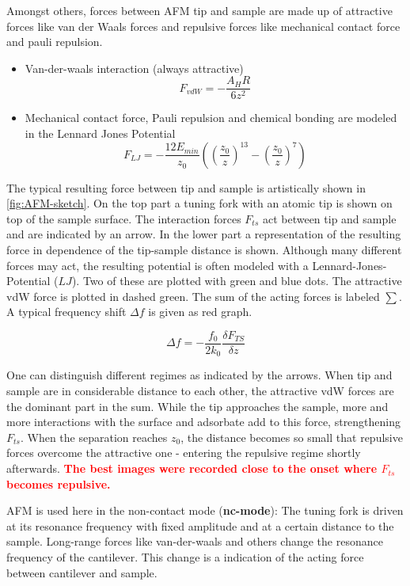 Amongst others, forces between AFM tip and sample are made up of attractive forces like van der Waals forces and repulsive forces like mechanical contact force and pauli repulsion.

\begin{itemize}
 \item Van-der-waals interaction (always attractive)
 $$ F_{vdW} = - \frac{A_HR}{6z^2}$$
 \item Mechanical contact force, Pauli repulsion and chemical bonding are modeled in the Lennard Jones Potential
$$ F_{LJ} = - \frac{12 E_{min}}{z_0} \left ( \left (\frac{z_0}{z} \right ) ^{13} - \left ( \frac{z_0}{z} \right )^7 \right ) $$
\end{itemize}

The typical resulting force between tip and sample is artistically shown in \autoref{fig:AFM-sketch}. On the top part a tuning fork with an atomic tip is shown on top of the sample surface. The interaction forces $F_{ts}$ act between tip and sample and are indicated by an arrow. In the lower part a representation of the resulting force in dependence of the tip-sample distance is shown. Although many different forces may act, the resulting potential is often modeled with a Lennard-Jones-Potential ($LJ$)\cite{jones_determination_1924}. Two of these are plotted with green and blue dots. The attractive vdW force is plotted in dashed green. The sum of the acting forces is labeled $\sum$. A typical frequency shift $\Delta f$ is given as red graph. 

$$\Delta f = - \frac{f_0}{2k_0}\frac{\delta F_{TS}}{\delta z}$$

One can distinguish different regimes as indicated by the arrows. When tip and sample are in considerable distance to each other, the attractive vdW forces are the dominant part in the sum. While the tip approaches the sample, more and more interactions with the surface and adsorbate add to this force, strengthening $F_{ts}$. When the separation reaches $z_0$, the distance becomes so small that repulsive forces overcome the attractive one - entering the repulsive regime shortly afterwards. \textcolor{red}{\textbf{The best images were recorded close to the onset where $F_{ts}$ becomes repulsive.}}

AFM is used here in the non-contact mode (\textbf{nc-mode}): The tuning fork is driven at its resonance frequency with fixed amplitude and at a certain distance to the sample. Long-range forces like van-der-waals and others change the resonance frequency of the cantilever. This change is a indication of the acting force between cantilever and sample. 

